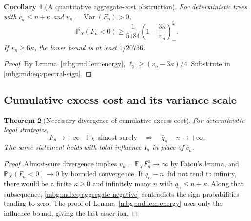 \documentclass[11pt,letterpaper]{article}
\newtheorem{theorem}{Theorem}[section]
\newtheorem{corollary}[theorem]{Corollary}
\theoremstyle{definition}
\newcommand{\E}{\mathbb E}
\newcommand{\Prb}{\mathbb P}
\DeclareMathOperator{\Var}{Var}
\begin{document}
\begin{corollary}[A quantitative aggregate-cost obstruction]
\label{mbg:rnd:cor:aggregate-quantitative}
For deterministic trees with $\bar q_n\le n+\kappa$ and
$v_n=\Var(F_n)>0$,
\begin{equation}
 \Prb_X(F_n<0)
 \ge\frac{1}{5184}\left(1-\frac{3\kappa}{v_n}\right)_+^2.
 \label{mbg:rnd:eq:aggregate-negative}
\end{equation}
If $v_n\ge6\kappa$, the lower bound is at least $1/20736$.
\end{corollary}
\begin{proof}
By Lemma~\ref{mbg:rnd:lem:energy}, $\ell_2\ge(v_n-3\kappa)/4$. Substitute in
\eqref{mbg:rnd:eq:spectral-sign}.
\end{proof}

\subsection{Cumulative excess cost and its variance scale}

\begin{theorem}[Necessary divergence of cumulative excess cost]
\label{mbg:rnd:thm:aggregate}
For deterministic legal strategies,
\begin{equation}
 F_n\longrightarrow+\infty\quad\Prb_X\text{-almost surely}
 \quad\Longrightarrow\quad \bar q_n-n\longrightarrow+\infty.
 \label{mbg:rnd:eq:aggregate-necessary}
\end{equation}
The same statement holds with total influence $I_n$ in place of $\bar q_n$.
\end{theorem}
\begin{proof}
Almost-sure divergence implies $v_n=\E_X F_n^2\to\infty$ by Fatou's
lemma, and $\Prb_X(F_n<0)\to0$ by bounded convergence. If $\bar q_n-n$
did not tend to infinity, there would be a finite $\kappa\ge0$ and
infinitely many $n$ with $\bar q_n\le n+\kappa$. Along that subsequence,
\eqref{mbg:rnd:eq:aggregate-negative} contradicts the sign probabilities
tending to zero. The proof of Lemma~\ref{mbg:rnd:lem:energy} uses only the influence
bound, giving the last assertion.
\end{proof}
\end{document}
